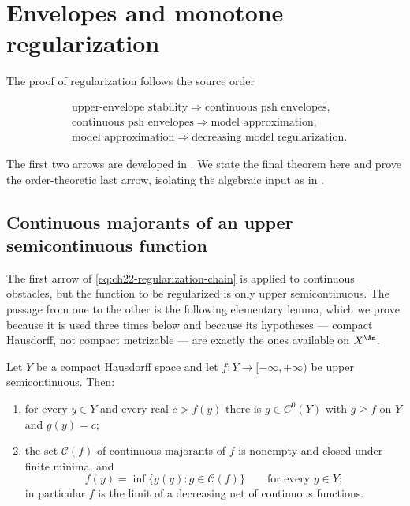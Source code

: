 \section{Envelopes and monotone regularization}
\label{sec:ch22-regularization}

The proof of regularization follows the source order

\[
 \begin{aligned}
  &\text{upper-envelope stability}
    \Longrightarrow \text{continuous psh envelopes},\\
  &\text{continuous psh envelopes}
    \Longrightarrow \text{model approximation},\\
  &\text{model approximation}
    \Longrightarrow \text{decreasing model regularization}.
 \end{aligned}
\tag{22.73}\label{eq:ch22-regularization-chain}
\]

The first two arrows are developed in .  We state
the final theorem here and prove the order-theoretic last arrow, isolating
the algebraic input as in .

\subsection{Continuous majorants of an upper semicontinuous function}

The first arrow of \eqref{eq:ch22-regularization-chain} is applied to
continuous obstacles, but the function to be regularized is only upper
semicontinuous.  The passage from one to the other is the following
elementary lemma, which we prove because it is used three times below and
because its hypotheses --- compact Hausdorff, not compact metrizable --- are
exactly the ones available on $X^{\An}$.

\begin{lemma}
\label{lem:ch22-continuous-majorant}
Let $Y$ be a compact Hausdorff space and let
$f:Y\to[-\infty,+\infty)$ be upper semicontinuous.  Then:
\begin{enumerate}
\item\label{itm:ch22-maj:point} for every $y\in Y$ and every real
$c>f(y)$ there is $g\in C^0(Y)$ with $g\geq f$ on $Y$ and
$g(y)=c$;
\item\label{itm:ch22-maj:inf} the set $\mathcal C(f)$ of continuous
majorants of $f$ is nonempty and closed under finite minima, and
\[
 f(y)=\inf\{g(y):g\in\mathcal C(f)\}
 \qquad\text{for every }y\in Y;
\tag{22.74}\label{eq:ch22-continuous-majorant-inf}
\]
in particular $f$ is the limit of a decreasing net of continuous
functions.
\end{enumerate}
\end{lemma}

